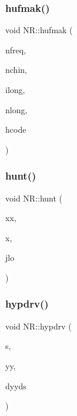 \mbox{\label{namespaceNR_ae3369986daacfe65a679f2334cb53267}} 
\subsubsection{\texorpdfstring{hufmak()}{hufmak()}}
{\footnotesize\ttfamily void N\+R\+::hufmak (\begin{DoxyParamCaption}\item[{\mbox{\hyperlink{namespaceNR_a117570729decc729db86f7655e7a23e5}{Vec\+\_\+\+I\+\_\+\+U\+L\+NG}} \&}]{nfreq,  }\item[{const unsigned long}]{nchin,  }\item[{unsigned long \&}]{ilong,  }\item[{unsigned long \&}]{nlong,  }\item[{\mbox{\hyperlink{classNR_1_1huffcode}{huffcode}} \&}]{hcode }\end{DoxyParamCaption})}

\mbox{\label{namespaceNR_a6bbdb382ae25b5c8c0baba1d48d848e1}} 
\subsubsection{\texorpdfstring{hunt()}{hunt()}}
{\footnotesize\ttfamily void N\+R\+::hunt (\begin{DoxyParamCaption}\item[{\mbox{\hyperlink{namespaceNR_a9f943da53862537c552e2a770cb170ae}{Vec\+\_\+\+I\+\_\+\+DP}} \&}]{xx,  }\item[{const \mbox{\hyperlink{namespaceNR_af6ff762dd605ff477b8e52387253a02a}{DP}}}]{x,  }\item[{int \&}]{jlo }\end{DoxyParamCaption})}

\mbox{\label{namespaceNR_a329631db0425541c0568938c22633e99}} 
\subsubsection{\texorpdfstring{hypdrv()}{hypdrv()}}
{\footnotesize\ttfamily void N\+R\+::hypdrv (\begin{DoxyParamCaption}\item[{const \mbox{\hyperlink{namespaceNR_af6ff762dd605ff477b8e52387253a02a}{DP}}}]{s,  }\item[{\mbox{\hyperlink{namespaceNR_a9f943da53862537c552e2a770cb170ae}{Vec\+\_\+\+I\+\_\+\+DP}} \&}]{yy,  }\item[{\mbox{\hyperlink{namespaceNR_a970094d23441f8ef6a45282a7eb2103d}{Vec\+\_\+\+O\+\_\+\+DP}} \&}]{dyyds }\end{DoxyParamCaption})}

